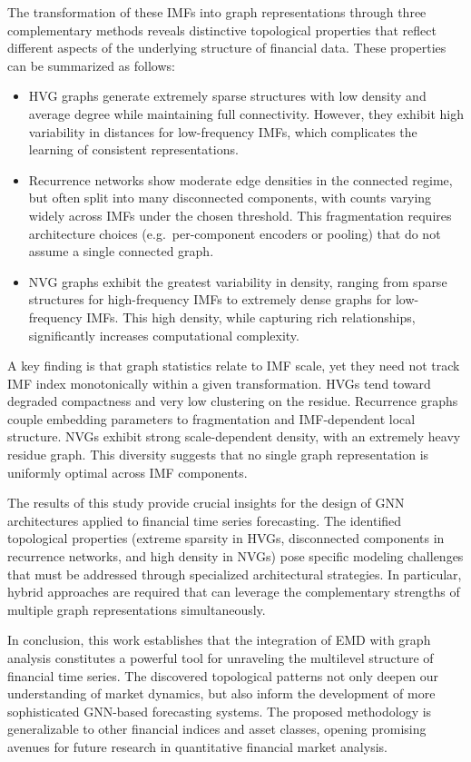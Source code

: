 \documentclass[11pt,a4paper]{article}
\begin{document}
The transformation of these IMFs into graph representations through three complementary methods reveals distinctive topological properties that reflect different aspects of the underlying structure of financial data. These properties can be summarized as follows:
\begin{itemize}
    \item HVG graphs generate extremely sparse structures with low density and average degree while maintaining full connectivity. However, they exhibit high variability in distances for low-frequency IMFs, which complicates the learning of consistent representations. 
    \item Recurrence networks show moderate edge densities in the connected regime, but often split into many disconnected components, with counts varying widely across IMFs under the chosen threshold. This fragmentation requires architecture choices (e.g.\ per-component encoders or pooling) that do not assume a single connected graph. 
    \item NVG graphs exhibit the greatest variability in density, ranging from sparse structures for high-frequency IMFs to extremely dense graphs for low-frequency IMFs. This high density, while capturing rich relationships, significantly increases computational complexity.
\end{itemize}


A key finding is that graph statistics relate to IMF scale, yet they need not track IMF index monotonically within a given transformation. HVGs tend toward degraded compactness and very low clustering on the residue. Recurrence graphs couple embedding parameters to fragmentation and IMF-dependent local structure. NVGs exhibit strong scale-dependent density, with an extremely heavy residue graph. This diversity suggests that no single graph representation is uniformly optimal across IMF components.

The results of this study provide crucial insights for the design of GNN architectures applied to financial time series forecasting. The identified topological properties (extreme sparsity in HVGs, disconnected components in recurrence networks, and high density in NVGs) pose specific modeling challenges that must be addressed through specialized architectural strategies. In particular, hybrid approaches are required that can leverage the complementary strengths of multiple graph representations simultaneously.

In conclusion, this work establishes that the integration of EMD with graph analysis constitutes a powerful tool for unraveling the multilevel structure of financial time series. The discovered topological patterns not only deepen our understanding of market dynamics, but also inform the development of more sophisticated GNN-based forecasting systems. The proposed methodology is generalizable to other financial indices and asset classes, opening promising avenues for future research in quantitative financial market analysis.
\end{document}
